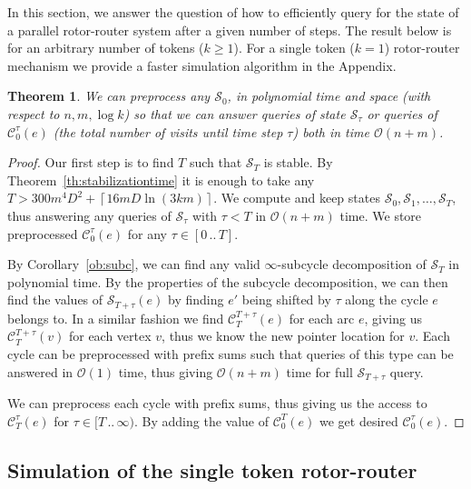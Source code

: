 \documentclass{article}[11pt,letter]
\newtheorem{theorem}[definition]{Theorem}
\newcommand{\bigo}{\mathcal{O}}
\newcommand{\state}{\mathcal{S}}
\newcommand{\cload}{\mathcal{C}}
\newcommand{\closedrange}[2]{[#1\,..\,#2]}
\newcommand{\halfrange}[2]{[#1\,..\,#2)}
\begin{document}
\label{sec:simulation}
In this section, we answer the question of how to efficiently query for the state of a parallel rotor-router system after a given number of steps. The result below is for an arbitrary number of tokens ($k \geq 1$).
For a single token ($k=1$) rotor-router mechanism we provide a faster simulation algorithm in the Appendix.

\begin{theorem}
\label{th:krr_query1}
We can preprocess any $\state_0$, in polynomial time and space (with respect to $n,m, \log k$) so that we can answer queries of  \emph{state} $\state_\tau$ or queries of $\cload_0^{\tau}(e)$ (the total number of visits until time step $\tau$) both in time $\bigo(n+m)$.
\end{theorem}

\begin{proof}
Our first step is to find $T$ such that $\state_T$ is stable. By Theorem~\ref{th:stabilizationtime} it is enough to take any $T > 300m^4D^2 + \left\lceil16mD \ln(3km)\right\rceil$.
We compute and keep states $\state_0,\state_1,\ldots,\state_T$, thus answering any queries of $\state_\tau$ with $\tau < T$ in $\bigo(n+m)$ time.
We store preprocessed $\cload_0^{\tau}(e)$ for any $\tau \in \closedrange{0}{T}$.

By Corollary~\ref{ob:subc}, we can find any valid $\infty$-subcycle decomposition of $\state_T$ in polynomial time.
By the properties of the subcycle decomposition, we can then find the values of $\state_{T+\tau}(e)$ by finding $e'$ being shifted by $\tau$ along the cycle $e$ belongs to. In a similar fashion we find $\cload_{T}^{T+\tau}(e)$ for each arc $e$, giving us $\cload_{T}^{T+\tau}(v)$ for each vertex $v$, thus we know the new pointer location for $v$. Each cycle can be preprocessed with prefix sums such that queries of this type can be answered in $\bigo(1)$ time, thus giving $\bigo(n+m)$ time for full $\state_{T+\tau}$ query.

We can preprocess each cycle with prefix sums, thus giving us the access to $\cload_{T}^{\tau}(e)$ for $\tau \in \halfrange{T}{\infty}$. By adding the value of $\cload_{0}^{T}(e)$ we get  desired $\cload_0^{\tau}(e)$.

\end{proof}

\subsection{Simulation of the single token rotor-router}
\end{document}
